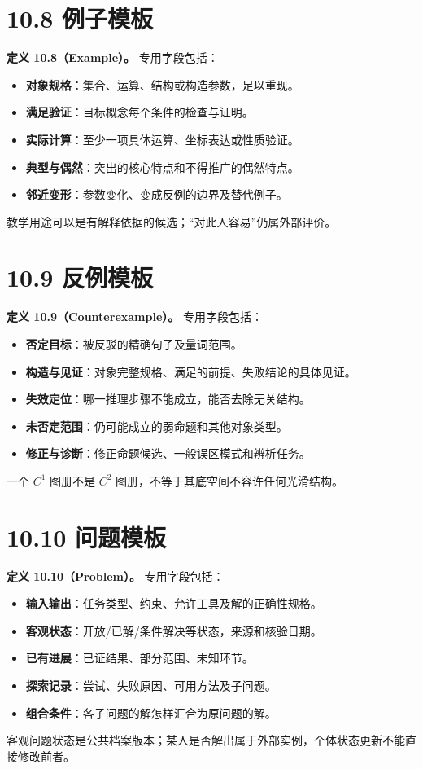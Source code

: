 \documentclass[UTF8,a4paper,zihao=-4,fontset=windows,openany]{ctexbook}
\begin{document}
\section{10.8 例子模板}
\textbf{定义 10.8（Example）。} 专用字段包括：

\begin{itemize}
\item \textbf{对象规格}：集合、运算、结构或构造参数，足以重现。
\item \textbf{满足验证}：目标概念每个条件的检查与证明。
\item \textbf{实际计算}：至少一项具体运算、坐标表达或性质验证。
\item \textbf{典型与偶然}：突出的核心特点和不得推广的偶然特点。
\item \textbf{邻近变形}：参数变化、变成反例的边界及替代例子。
\end{itemize}
教学用途可以是有解释依据的候选；“对此人容易”仍属外部评价。

\section{10.9 反例模板}
\textbf{定义 10.9（Counterexample）。} 专用字段包括：

\begin{itemize}
\item \textbf{否定目标}：被反驳的精确句子及量词范围。
\item \textbf{构造与见证}：对象完整规格、满足的前提、失败结论的具体见证。
\item \textbf{失效定位}：哪一推理步骤不能成立，能否去除无关结构。
\item \textbf{未否定范围}：仍可能成立的弱命题和其他对象类型。
\item \textbf{修正与诊断}：修正命题候选、一般误区模式和辨析任务。
\end{itemize}
一个 \(C^1\) 图册不是 \(C^2\) 图册，不等于其底空间不容许任何光滑结构。

\section{10.10 问题模板}
\textbf{定义 10.10（Problem）。} 专用字段包括：

\begin{itemize}
\item \textbf{输入输出}：任务类型、约束、允许工具及解的正确性规格。
\item \textbf{客观状态}：开放/已解/条件解决等状态，来源和核验日期。
\item \textbf{已有进展}：已证结果、部分范围、未知环节。
\item \textbf{探索记录}：尝试、失败原因、可用方法及子问题。
\item \textbf{组合条件}：各子问题的解怎样汇合为原问题的解。
\end{itemize}
客观问题状态是公共档案版本；某人是否解出属于外部实例，个体状态更新不能直接修改前者。
\end{document}
